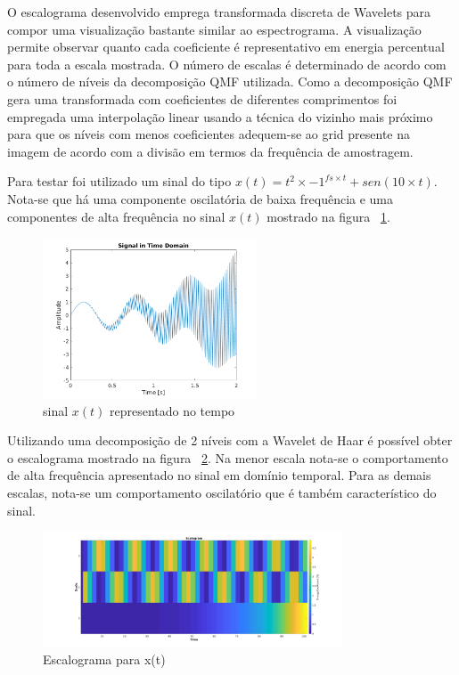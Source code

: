 \documentclass{article}
\begin{document}
O escalograma desenvolvido emprega transformada discreta de Wavelets para compor uma visualização bastante similar ao espectrograma. A visualização permite observar quanto cada coeficiente é representativo em energia percentual para toda a escala mostrada. O número de escalas é determinado de acordo com o número de níveis da decomposição QMF utilizada. Como a decomposição QMF gera uma transformada com coeficientes de diferentes comprimentos foi empregada uma interpolação linear usando a técnica do vizinho mais próximo para que os níveis com menos coeficientes adequem-se ao grid presente na imagem de acordo com a divisão em termos da frequência de amostragem.

Para testar foi utilizado um sinal do tipo $x(t) = t^2\times-1^{fs \times t} + sen(10 \times t)$. Nota-se que há uma componente oscilatória de baixa frequência e uma componentes de alta frequência no sinal $x(t)$ mostrado na figura ~\ref{fig:x}.
\begin{figure}[h]
	\begin{center}
		\includegraphics[width=2.5in]{Figures/scalogram_signal.png}
		\caption{sinal $x(t)$ representado no tempo}
		\label{fig:x}
	\end{center}
\end{figure}

Utilizando uma decomposição de 2 níveis com a Wavelet de Haar é possível obter o escalograma mostrado na figura ~\ref{fig:sc}. Na menor escala nota-se o comportamento de alta frequência apresentado no sinal em domínio temporal. Para as demais escalas, nota-se um comportamento oscilatório que é também característico do sinal.
\begin{figure}[h]
	\begin{center}
		\includegraphics[width=3.5in]{Figures/scalogram.png}
		\caption{Escalograma para x(t)}
		\label{fig:sc}
	\end{center}
\end{figure}
\end{document}

